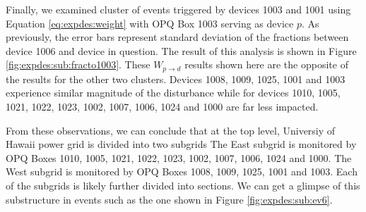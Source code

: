 Finally, we examined cluster of events triggered by devices 1003 and 1001 using Equation \ref{eq:expdes:weight} with OPQ Box 1003 serving as device $p$.
As previously, the error bars represent standard deviation of the fractions between device 1006 and device in question.
The result of this analysis is shown in Figure \ref{fig:expdes:sub:fracto1003}.
These $W_{p \rightarrow d}$ results shown here are the opposite of the results for the other two clusters.
Devices 1008, 1009, 1025, 1001 and 1003 experience similar magnitude of the disturbance while for devices 1010, 1005, 1021, 1022, 1023, 1002, 1007, 1006, 1024 and 1000 are far less impacted.

From these observations, we can conclude that at the top level, Universiy of Hawaii power grid is divided into two subgrids
The East subgrid is monitored by OPQ Boxes 1010, 1005, 1021, 1022, 1023, 1002, 1007, 1006, 1024 and 1000.
The West subgrid is monitored by OPQ Boxes 1008, 1009, 1025, 1001 and 1003.
Each of the subgrids is likely further divided into sections.
We can get a glimpse of this substructure in events such as the one shown in Figure \ref{fig:expdes:sub:ev6}.
